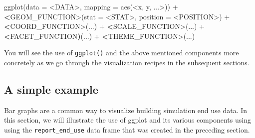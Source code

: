 \documentclass[
]{book}
\newenvironment{Shaded}{\begin{snugshade}}{\end{snugshade}}
\newcommand{\AttributeTok}[1]{\textcolor[rgb]{0.77,0.63,0.00}{#1}}
\newcommand{\ErrorTok}[1]{\textcolor[rgb]{0.64,0.00,0.00}{\textbf{#1}}}
\newcommand{\FunctionTok}[1]{\textcolor[rgb]{0.00,0.00,0.00}{#1}}
\newcommand{\NormalTok}[1]{#1}
\newcommand{\SpecialCharTok}[1]{\textcolor[rgb]{0.00,0.00,0.00}{#1}}
\begin{document}
\begin{Shaded}
\begin{Highlighting}[]
\FunctionTok{ggplot}\NormalTok{(}\AttributeTok{data =} \SpecialCharTok{\textless{}}\NormalTok{DATA}\SpecialCharTok{\textgreater{}}\NormalTok{, }\AttributeTok{mapping =} \FunctionTok{aes}\NormalTok{(}\SpecialCharTok{\textless{}}\NormalTok{x, y, ...}\SpecialCharTok{\textgreater{}}\NormalTok{)) }\SpecialCharTok{+}
    \ErrorTok{\textless{}}\NormalTok{GEOM\_FUNCTION}\SpecialCharTok{\textgreater{}}\NormalTok{(}\AttributeTok{stat =} \SpecialCharTok{\textless{}}\NormalTok{STAT}\SpecialCharTok{\textgreater{}}\NormalTok{, }\AttributeTok{position =} \SpecialCharTok{\textless{}}\NormalTok{POSITION}\SpecialCharTok{\textgreater{}}\NormalTok{) }\SpecialCharTok{+}
    \ErrorTok{\textless{}}\NormalTok{COORD\_FUNCTION}\SpecialCharTok{\textgreater{}}\NormalTok{(...) }\SpecialCharTok{+}
    \ErrorTok{\textless{}}\NormalTok{SCALE\_FUNCTION}\SpecialCharTok{\textgreater{}}\NormalTok{(...) }\SpecialCharTok{+}
    \ErrorTok{\textless{}}\NormalTok{FACET\_FUNCTION}\ErrorTok{)}\NormalTok{(...) }\SpecialCharTok{+}
    \ErrorTok{\textless{}}\NormalTok{THEME\_FUNCTION}\SpecialCharTok{\textgreater{}}\NormalTok{(...)}
\end{Highlighting}
\end{Shaded}

You will see the use of \texttt{ggplot()} and the above mentioned components more concretely as we go through the visualization recipes in the subsequent sections.

\hypertarget{a-simple-example}{%
\subsection{A simple example}\label{a-simple-example}}

Bar graphs are a common way to visualize building simulation end use data. In this section, we will illustrate the use of ggplot and its various components using using the \texttt{report\_end\_use} data frame that was created in the preceding section.
\end{document}
